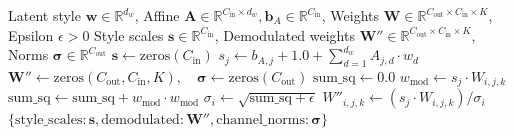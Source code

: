 \documentclass[11pt,a4paper]{article}
\theoremstyle{definition}
\begin{document}
\begin{algorithm}[H]
\caption{StyleGAN Style Modulation and Demodulation Forward Pass}
\label{alg:stylegan_mod}
\begin{algorithmic}[1]
\Require Latent style $\mathbf{w} \in \mathbb{R}^{d_w}$, Affine $\mathbf{A} \in \mathbb{R}^{C_{\text{in}} \times d_w}, \mathbf{b}_A \in \mathbb{R}^{C_{\text{in}}}$, Weights $\mathbf{W} \in \mathbb{R}^{C_{\text{out}} \times C_{\text{in}} \times K}$, Epsilon $\epsilon > 0$
\Ensure Style scales $\mathbf{s} \in \mathbb{R}^{C_{\text{in}}}$, Demodulated weights $\mathbf{W}'' \in \mathbb{R}^{C_{\text{out}} \times C_{\text{in}} \times K}$, Norms $\boldsymbol{\sigma} \in \mathbb{R}^{C_{\text{out}}}$
\State $\mathbf{s} \gets \text{zeros}(C_{\text{in}})$
    \State $s_j \gets b_{A, j} + 1.0 + \sum_{d=1}^{d_w} A_{j, d} \cdot w_d$
\EndFor
\State $\mathbf{W}'' \gets \text{zeros}(C_{\text{out}}, C_{\text{in}}, K), \quad \boldsymbol{\sigma} \gets \text{zeros}(C_{\text{out}})$
    \State $\text{sum\_sq} \gets 0.0$
            \State $w_{\text{mod}} \gets s_j \cdot W_{i, j, k}$
            \State $\text{sum\_sq} \gets \text{sum\_sq} + w_{\text{mod}} \cdot w_{\text{mod}}$
        \EndFor
    \EndFor
    \State $\sigma_i \gets \sqrt{\text{sum\_sq} + \epsilon}$
            \State $W''_{i, j, k} \gets (s_j \cdot W_{i, j, k}) / \sigma_i$
        \EndFor
    \EndFor
\EndFor
\State \Return $\{\text{style\_scales}: \mathbf{s}, \text{demodulated}: \mathbf{W}'', \text{channel\_norms}: \boldsymbol{\sigma}\}$
\end{algorithmic}
\end{algorithm}
\end{document}

